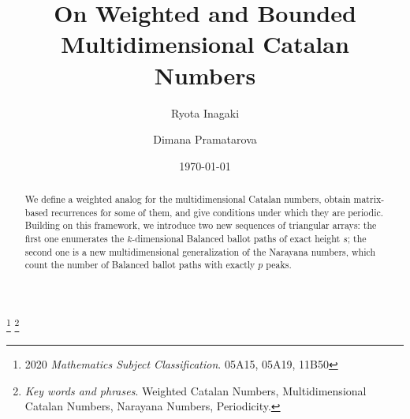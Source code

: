\documentclass[12pt,notitlepage]{amsart}
\numberwithin{equation}{section}
\theoremstyle{thmstyleone}%
\theoremstyle{thmstyletwo}%
\theoremstyle{thmstylethree}%
\numberwithin{theorem}{section}
\numberwithin{equation}{section}
\begin{document}

\title{On Weighted and Bounded Multidimensional Catalan Numbers}

\author{Ryota Inagaki}
\address{Department of Mathematics, Massachusetts Institute of Technology}

\author{Dimana Pramatarova}
\address{"Akademik Kiril Popov" High school of Mathematics}


\date{\today}
\thanks{2020 \emph{Mathematics Subject Classification}. 05A15, 05A19, 11B50}
\thanks{\emph{Key words and phrases}. Weighted Catalan Numbers, Multidimensional Catalan Numbers, Narayana Numbers, Periodicity.}
\begin{abstract}We define a weighted analog for the multidimensional Catalan numbers, obtain matrix-based recurrences for some of them, and give conditions under which they are periodic. Building on this framework, we introduce two new sequences of triangular arrays: the first one enumerates the $k$-dimensional Balanced ballot paths of exact height $s$; the second one is a new multidimensional generalization of the Narayana numbers, which count the number of Balanced ballot paths with exactly $p$ peaks.\end{abstract} 

\maketitle 
\end{document}
